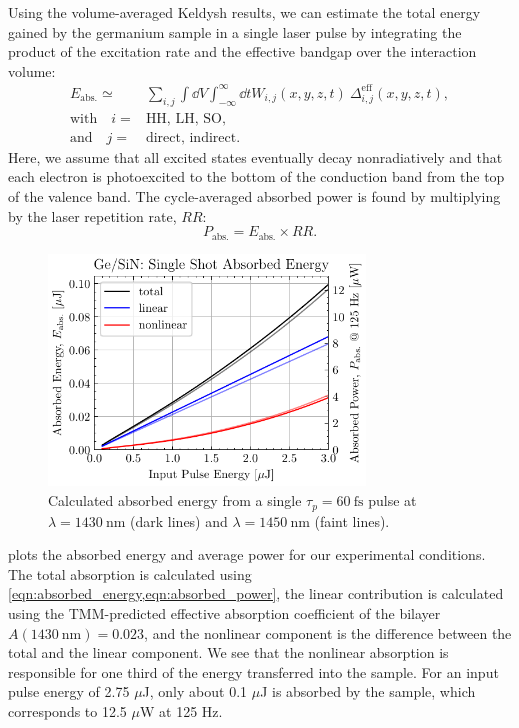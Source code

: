 Using the volume-averaged Keldysh results, we can estimate the total energy gained by the germanium sample in a single laser pulse by integrating the product of the excitation rate and the effective bandgap over the interaction volume:
\begin{equation}
\begin{split}
E_{\textrm{abs.}} \simeq {}& \sum_{i,j} \int \dd{V} \int_{-\infty}^{\infty} \dd{t} W_{i,j} (x, y, z, t) \ \Delta_{i,j}^{\textrm{eff}}(x,y,z,t), \\
\textrm{with} \quad i={}&\textrm{HH, LH, SO}, \\
\textrm{and} \quad j={}&\textrm{direct, indirect.}
\end{split}
\label{eqn:absorbed_energy}
\end{equation}
Here, we assume that all excited states eventually decay nonradiatively and that each electron is photoexcited to the bottom of the conduction band from the top of the valence band. The cycle-averaged absorbed power is found by multiplying by the laser repetition rate, $RR$:
\begin{equation}
P_{\textrm{abs.}} = E_{\textrm{abs.}} \times RR.
\label{eqn:absorbed_power}
\end{equation}

\begin{figure}
	\centering
	\includegraphics[width=0.75\textwidth]{figures/chap4/Single_shot_abs_ener.pdf}
	\caption{Calculated absorbed energy from a single $\tau_p = 60 \ \textrm{fs}$ pulse at $\lambda=1430 \ \textrm{nm}$ (dark lines) and $\lambda = 1450 \ \textrm{nm}$ (faint lines).}
	\label{fig:Single_shot_abs_ener}
\end{figure}

 plots the absorbed energy and average power for our experimental conditions. The total absorption is calculated using \cref{eqn:absorbed_energy,eqn:absorbed_power}, the linear contribution is calculated using the TMM-predicted effective absorption coefficient of the bilayer $A (1430 \ \textrm{nm}) = 0.023$, and the nonlinear component is the difference between the total and the linear component. We see that the nonlinear absorption is responsible for one third of the energy transferred into the sample. For an input pulse energy of 2.75 $\mu$J, only about 0.1 $\mu$J is absorbed by the sample, which corresponds to 12.5 $\mu$W at 125 Hz.

